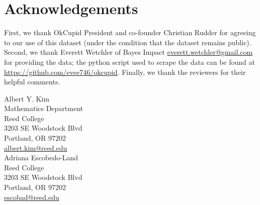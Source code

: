 \documentclass{article}\usepackage[]{graphicx}\usepackage[]{color}
\begin{document}
%
\section{Acknowledgements}\label{ack}
%
First, we thank OkCupid President and co-founder Christian Rudder for agreeing to our use of this dataset (under the condition that the dataset remains public).  Second, we thank Everett Wetchler of Bayes Impact \url{everett.wetchler@gmail.com} for providing the data; the python script used to scrape the data can be found at \url{https://github.com/evee746/okcupid}.  Finally, we thank the reviewers for their helpful comments.

\noindent\makebox[\linewidth]{\rule{\textwidth}{0.4pt}}

\noindent Albert Y. Kim\\
Mathematics Department\\
Reed College\\
3203 SE Woodstock Blvd\\
Portland, OR 97202\\
\url{albert.kim@reed.edu}\\

\noindent Adriana Escobedo-Land\\
Reed College\\
3203 SE Woodstock Blvd\\
Portland, OR 97202\\
\url{escobad@reed.edu}










%
%


\end{document}
